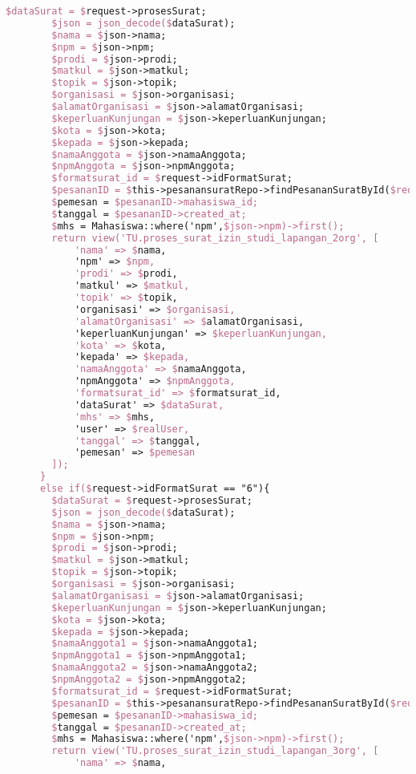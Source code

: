 \begin{lstlisting}[language=tex,basicstyle=\tiny,caption=PesanansuratController.php]
        $dataSurat = $request->prosesSurat;
        $json = json_decode($dataSurat);
        $nama = $json->nama;
        $npm = $json->npm;
        $prodi = $json->prodi;
        $matkul = $json->matkul;
        $topik = $json->topik;
        $organisasi = $json->organisasi;
        $alamatOrganisasi = $json->alamatOrganisasi;
        $keperluanKunjungan = $json->keperluanKunjungan;
        $kota = $json->kota;
        $kepada = $json->kepada;
        $namaAnggota = $json->namaAnggota;
        $npmAnggota = $json->npmAnggota;
        $formatsurat_id = $request->idFormatSurat;
        $pesananID = $this->pesanansuratRepo->findPesananSuratById($request->id);
        $pemesan = $pesananID->mahasiswa_id;
        $tanggal = $pesananID->created_at;
        $mhs = Mahasiswa::where('npm',$json->npm)->first();
        return view('TU.proses_surat_izin_studi_lapangan_2org', [
            'nama' => $nama,
            'npm' => $npm,
            'prodi' => $prodi,
            'matkul' => $matkul,
            'topik' => $topik,
            'organisasi' => $organisasi,
            'alamatOrganisasi' => $alamatOrganisasi,
            'keperluanKunjungan' => $keperluanKunjungan,
            'kota' => $kota,
            'kepada' => $kepada,
            'namaAnggota' => $namaAnggota,
            'npmAnggota' => $npmAnggota,
            'formatsurat_id' => $formatsurat_id,
            'dataSurat' => $dataSurat,
            'mhs' => $mhs,
            'user' => $realUser,
            'tanggal' => $tanggal,
            'pemesan' => $pemesan
        ]);
      }
      else if($request->idFormatSurat == "6"){
        $dataSurat = $request->prosesSurat;
        $json = json_decode($dataSurat);
        $nama = $json->nama;
        $npm = $json->npm;
        $prodi = $json->prodi;
        $matkul = $json->matkul;
        $topik = $json->topik;
        $organisasi = $json->organisasi;
        $alamatOrganisasi = $json->alamatOrganisasi;
        $keperluanKunjungan = $json->keperluanKunjungan;
        $kota = $json->kota;
        $kepada = $json->kepada;
        $namaAnggota1 = $json->namaAnggota1;
        $npmAnggota1 = $json->npmAnggota1;
        $namaAnggota2 = $json->namaAnggota2;
        $npmAnggota2 = $json->npmAnggota2;
        $formatsurat_id = $request->idFormatSurat;
        $pesananID = $this->pesanansuratRepo->findPesananSuratById($request->id);
        $pemesan = $pesananID->mahasiswa_id;
        $tanggal = $pesananID->created_at;
        $mhs = Mahasiswa::where('npm',$json->npm)->first();
        return view('TU.proses_surat_izin_studi_lapangan_3org', [
            'nama' => $nama,

\end{lstlisting}
